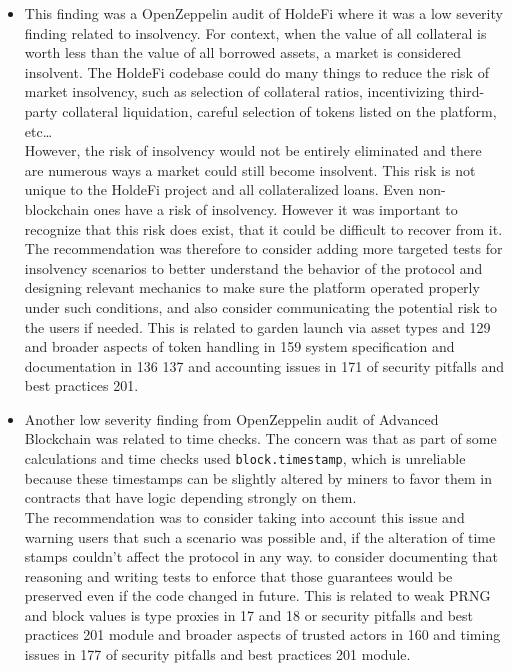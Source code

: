 \begin{itemize}
\item
  This finding was a OpenZeppelin audit of HoldeFi where it was a low
  severity finding related to insolvency. For context, when the value of
  all collateral is worth less than the value of all borrowed assets, a
  market is considered insolvent. The HoldeFi codebase could do many
  things to reduce the risk of market insolvency, such as selection of
  collateral ratios, incentivizing third-party collateral liquidation,
  careful selection of tokens listed on the platform, etc\ldots{}\\

  However, the risk of insolvency would not be entirely eliminated and
  there are numerous ways a market could still become insolvent. This
  risk is not unique to the HoldeFi project and all collateralized
  loans. Even non-blockchain ones have a risk of insolvency. However it
  was important to recognize that this risk does exist, that it could be
  difficult to recover from it.\\

  The recommendation was therefore to consider adding more targeted
  tests for insolvency scenarios to better understand the behavior of
  the protocol and designing relevant mechanics to make sure the
  platform operated properly under such conditions, and also consider
  communicating the potential risk to the users if needed. This is
  related to garden launch via asset types and 129 and broader aspects
  of token handling in 159 system specification and documentation in 136
  137 and accounting issues in 171 of security pitfalls and best
  practices 201.
\item
  Another low severity finding from OpenZeppelin audit of Advanced
  Blockchain was related to time checks. The concern was that as part of
  some calculations and time checks used \texttt{block.timestamp}, which
  is unreliable because these timestamps can be slightly altered by
  miners to favor them in contracts that have logic depending strongly
  on them.\\

  The recommendation was to consider taking into account this issue and
  warning users that such a scenario was possible and, if the alteration
  of time stamps couldn't affect the protocol in any way. to consider
  documenting that reasoning and writing tests to enforce that those
  guarantees would be preserved even if the code changed in future. This
  is related to weak PRNG and block values is type proxies in 17 and 18
  or security pitfalls and best practices 201 module and broader aspects
  of trusted actors in 160 and timing issues in 177 of security pitfalls
  and best practices 201 module.
\end{itemize}

